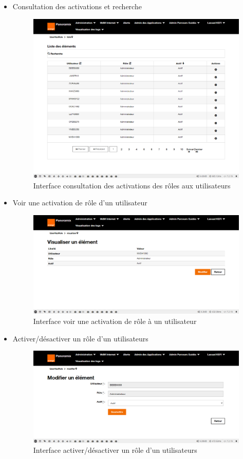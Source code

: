 \begin{itemize}
	\item Consultation des activations et recherche
	\begin{figure}[H]
		\centering
		\includegraphics[width=0.5\linewidth]{"img/screenshots/activation des roles/index"}
		\caption[Interface consultation des activations des rôles aux utilisateurs]{Interface consultation des activations des rôles aux utilisateurs}
		\label{fig:index-activation}
	\end{figure}
	
	\item Voir une activation de rôle d'un utilisateur
	\begin{figure}[H]
		\centering
		\includegraphics[width=0.7\linewidth]{"img/screenshots/activation des roles/view"}
		\caption[Interface voir une activation de rôle à un utilisateur]{Interface voir une activation de rôle à un utilisateur}
		\label{fig:view-activation}
	\end{figure}

	\item Activer/désactiver un rôle d'un utilisateurs
	\begin{figure}[H]
		\centering
		\includegraphics[width=0.7\linewidth]{"img/screenshots/activation des roles/edit"}
		\caption[Interface activer/désactiver un rôle d'un utilisateurs]{Interface activer/désactiver un rôle d'un utilisateurs}
		\label{fig:create-activation}
	\end{figure}
\end{itemize}

